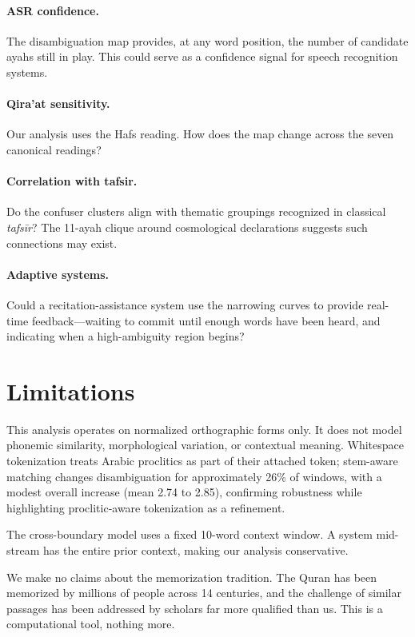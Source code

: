 \documentclass[11pt,a4paper]{article}
\begin{document}
\paragraph{ASR confidence.}
The disambiguation map provides, at any word position, the number of candidate ayahs still in play.
This could serve as a confidence signal for speech recognition systems.

\paragraph{Qira'at sensitivity.}
Our analysis uses the Hafs reading.
How does the map change across the seven canonical readings?

\paragraph{Correlation with tafsir.}
Do the confuser clusters align with thematic groupings recognized in classical \emph{tafs\=ir}?
The 11-ayah clique around cosmological declarations suggests such connections may exist.

\paragraph{Adaptive systems.}
Could a recitation-assistance system use the narrowing curves to provide real-time feedback---waiting to commit until enough words have been heard, and indicating when a high-ambiguity region begins?

\section{Limitations}
\label{sec:limitations}

This analysis operates on normalized orthographic forms only.
It does not model phonemic similarity, morphological variation, or contextual meaning.
Whitespace tokenization treats Arabic proclitics as part of their attached token; stem-aware matching changes disambiguation for approximately 26\% of windows, with a modest overall increase (mean 2.74 to 2.85), confirming robustness while highlighting proclitic-aware tokenization as a refinement.

The cross-boundary model uses a fixed 10-word context window.
A system mid-stream has the entire prior context, making our analysis conservative.

We make no claims about the memorization tradition.
The Quran has been memorized by millions of people across 14 centuries, and the challenge of similar passages has been addressed by scholars far more qualified than us.
This is a computational tool, nothing more.
\end{document}
